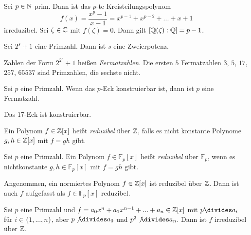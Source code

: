 \documentclass{cheat-sheet}
\newcommand{\F}{\mathbb{F}} %
\begin{document}
\begin{lem}
  Sei $p \in \mathbb{N}$ prim. Dann ist das $p$-te Kreisteilungspolynom
  \[ f(x) = \frac{x^p - 1}{x-1} = x^{p-1} + x^{p-2} + ... + x + 1 \]
  irreduzibel. Sei $\zeta \in \mathbb{C}$ mit $f(\zeta) = 0$. Dann gilt $[ \mathbb{Q}(\zeta) : \mathbb{Q} ] = p-1$.
\end{lem}

\begin{lem}
  Sei $2^s + 1$ eine Primzahl. Dann ist $s$ eine Zweierpotenz.
\end{lem}

\begin{bem}
  Zahlen der Form $2^{2^r} + 1$ heißen \emph{Fermatzahlen}. Die ersten $5$ Fermatzahlen
  $3$, $5$, $17$, $257$, $65537$ sind Primzahlen, die sechste nicht.
\end{bem}

\begin{satz}
  Sei $p$ eine Primzahl. Wenn das $p$-Eck konstruierbar ist, dann ist $p$ eine Fermatzahl.
\end{satz}

\begin{satz}[Gauß]
  Das $17$-Eck ist konstruierbar.
\end{satz}


\begin{defn}
  Ein Polynom $f \in \mathbb{Z}[x]$ heißt \emph{reduzibel} über $\mathbb{Z}$, falls es nicht konstante Polynome $g, h \in \mathbb{Z}[x]$ mit $f = gh$ gibt.
\end{defn}

\begin{defn}
  Sei $p$ eine Primzahl. Ein Polynom $f \in \F_p[x]$ heißt \emph{reduzibel} über $\F_p$, wenn es nichtkonstante $g, h \in \F_p[x]$ mit $f = gh$ gibt.
\end{defn}

\begin{defn}
  Angenommen, ein normiertes Polynom $f \in \mathbb{Z}[x]$ ist reduzibel über $\mathbb{Z}$. Dann ist auch $f$ aufgefasst als $f \in \F_p[x]$ reduzibel.
\end{defn}

\begin{satz}[Eisenstein]
  Sei $p$ eine Primzahl und $f = a_0 x^n + a_1 x^{n-1} + ... + a_n \in \mathbb{Z}[x]$ mit $p \divides a_i$ für $i \in \{ 1, ..., n \}$, aber $p \not\divides a_0$ und $p^2 \not\divides a_n$. Dann ist $f$ irreduzibel über $\mathbb{Z}$.
\end{satz}
\end{document}
